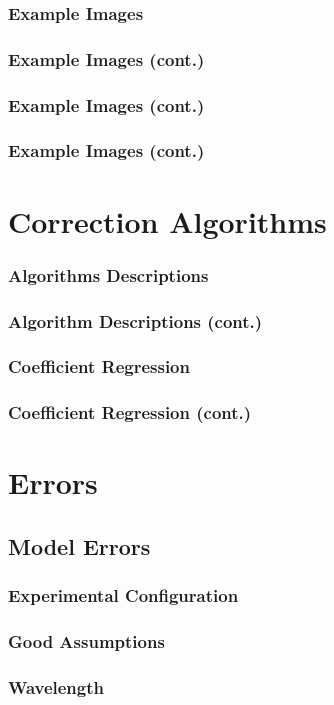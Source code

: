 \documentclass[red]{beamer}
\begin{document}
\begin{frame}
	\frametitle{Example Images}
\end{frame}

\begin{frame}
	\frametitle{Example Images (cont.)}
\end{frame}

\begin{frame}
	\frametitle{Example Images (cont.)}
\end{frame}

\begin{frame}
	\frametitle{Example Images (cont.)}
\end{frame}

\section{Correction Algorithms}
\begin{frame}
	\frametitle{Algorithms Descriptions}
\end{frame}

\begin{frame}
	\frametitle{Algorithm Descriptions (cont.)}
\end{frame}

\begin{frame}
	\frametitle{Coefficient Regression}
\end{frame}

\begin{frame}
	\frametitle{Coefficient Regression (cont.)}
\end{frame}

\section{Errors}
\subsection{Model Errors}
\begin{frame}
	\frametitle{Experimental Configuration}
\end{frame}

\begin{frame}
	\frametitle{Good Assumptions}
\end{frame}

\begin{frame}
	\frametitle{Wavelength}
\end{frame}
\end{document}
